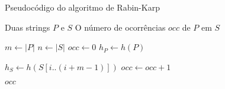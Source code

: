 \begin{frame}[fragile]{Pseudocódigo do algoritmo de Rabin-Karp}

    \begin{algorithm}[H]
        \caption{Algoritmo de Rabin-Karp -- Naive}
        \begin{algorithmic}[1]
            \Require Duas strings $P$ e $S$
            \Ensure O número de ocorrências $occ$ de $P$ em $S$

                \State $m \gets |P|$
                \State $n \gets |S|$
                \State $occ \gets 0$
                \State $h_P \gets h(P)$

                    \State $h_S \gets h(S[i..(i + m - 1)])$
                            \State $occ \gets occ + 1$
                        \EndIf
                    \EndIf
                \EndFor

                \State \Return $occ$
            \EndFunction
        \end{algorithmic}
    \end{algorithm}

\end{frame}


